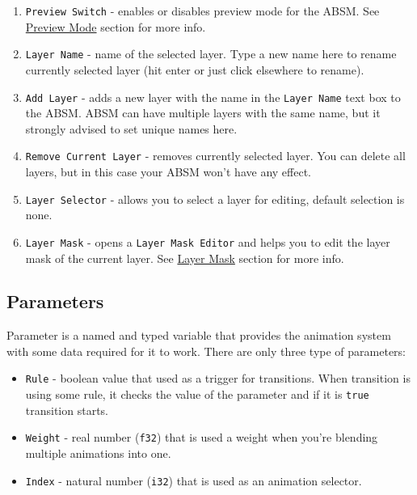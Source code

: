 \documentclass[
]{book}
\providecommand{\tightlist}{%
  \setlength{\itemsep}{0pt}\setlength{\parskip}{0pt}}
\theoremstyle{definition}
\theoremstyle{definition}
\theoremstyle{definition}
\theoremstyle{definition}
\theoremstyle{remark}
\begin{document}
\begin{enumerate}
\def\labelenumi{\arabic{enumi}.}
\tightlist
\item
  \texttt{Preview\ Switch} - enables or disables preview mode for the ABSM. See \hyperref[preview-mode]{Preview Mode} section for more info.
\item
  \texttt{Layer\ Name} - name of the selected layer. Type a new name here to rename currently selected layer (hit enter or just click elsewhere to rename).
\item
  \texttt{Add\ Layer} - adds a new layer with the name in the \texttt{Layer\ Name} text box to the ABSM. ABSM can have multiple layers with the same name, but it strongly advised to set unique names here.
\item
  \texttt{Remove\ Current\ Layer} - removes currently selected layer. You can delete all layers, but in this case your ABSM won't have any effect.
\item
  \texttt{Layer\ Selector} - allows you to select a layer for editing, default selection is none.
\item
  \texttt{Layer\ Mask} - opens a \texttt{Layer\ Mask\ Editor} and helps you to edit the layer mask of the current layer. See
  \hyperref[layer-mask]{Layer Mask} section for more info.
\end{enumerate}

\subsection{Parameters}\label{parameters}

Parameter is a named and typed variable that provides the animation system with some data required for it to work. There are only three type of parameters:

\begin{itemize}
\tightlist
\item
  \texttt{Rule} - boolean value that used as a trigger for transitions. When transition is using some rule, it checks the value of the parameter and if it is \texttt{true} transition starts.
\item
  \texttt{Weight} - real number (\texttt{f32}) that is used a weight when you're blending multiple animations into one.
\item
  \texttt{Index} - natural number (\texttt{i32}) that is used as an animation selector.
\end{itemize}
\end{document}
